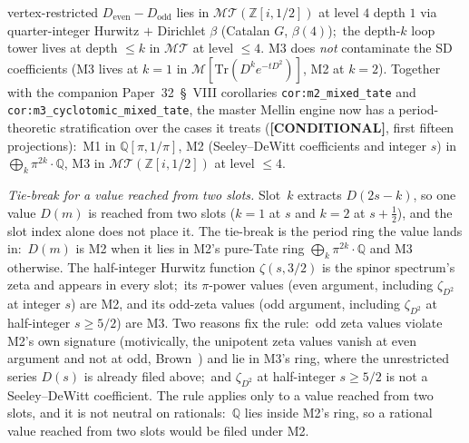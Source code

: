 \documentclass[aps,pra,twocolumn,superscriptaddress,longbibliography]{revtex4-2}
\begin{document}
vertex-restricted $D_{\mathrm{even}} - D_{\mathrm{odd}}$ lies in
$\mathcal{MT}(\mathbb{Z}[i, 1/2])$ at level $4$ depth $1$ via
quarter-integer Hurwitz $+$ Dirichlet $\beta$ (Catalan $G$,
$\beta(4)$);\ the depth-$k$ loop tower lives at depth $\le k$ in
$\mathcal{MT}$ at level $\le 4$.  M3 does \emph{not}
contaminate the SD coefficients (M3 lives at $k=1$ in
$\mathcal{M}[\mathrm{Tr}(D^k e^{-tD^2})]$, M2 at $k=2$).  Together
with the companion Paper~32~\S~VIII corollaries
\texttt{cor:m2\_mixed\_tate} and \texttt{cor:m3\_cyclotomic\_mixed\_tate},
the master Mellin engine now has a period-theoretic stratification over
the cases it treats (\textbf{[CONDITIONAL]}, first fifteen projections):\
M1 in $\mathbb{Q}[\pi, 1/\pi]$, M2 (Seeley--DeWitt coefficients and
integer $s$) in $\bigoplus_k \pi^{2k}\cdot\mathbb{Q}$, M3 in
$\mathcal{MT}(\mathbb{Z}[i, 1/2])$ at level $\le 4$.

\emph{Tie-break for a value reached from two slots.}  Slot~$k$
extracts $D(2s - k)$, so one value $D(m)$ is reached from two slots
($k = 1$ at $s$ and $k = 2$ at $s + \tfrac{1}{2}$), and the slot index
alone does not place it.  The tie-break is the period ring the value
lands in:\ $D(m)$ is M2 when it lies in M2's pure-Tate ring
$\bigoplus_k \pi^{2k}\cdot\mathbb{Q}$ and M3 otherwise.  The
half-integer Hurwitz function $\zeta(s, 3/2)$ is the spinor spectrum's
zeta and appears in every slot;\ its $\pi$-power values (even argument,
including $\zeta_{D^2}$ at integer $s$) are M2, and its odd-zeta values
(odd argument, including $\zeta_{D^2}$ at half-integer $s \ge 5/2$)
are M3.  Two reasons fix the rule:\ odd zeta values violate M2's own
signature (motivically, the unipotent zeta values vanish at even argument and not at odd,
Brown~\cite{brown_icm2014}) and lie in M3's ring, where the unrestricted series $D(s)$ is
already filed above;\ and $\zeta_{D^2}$ at half-integer $s \ge 5/2$ is
not a Seeley--DeWitt coefficient.  The rule applies only to a value
reached from two slots, and it is not neutral on rationals:\ $\mathbb{Q}$
lies inside M2's ring, so a rational value reached from two slots would
be filed under M2.
\end{document}
